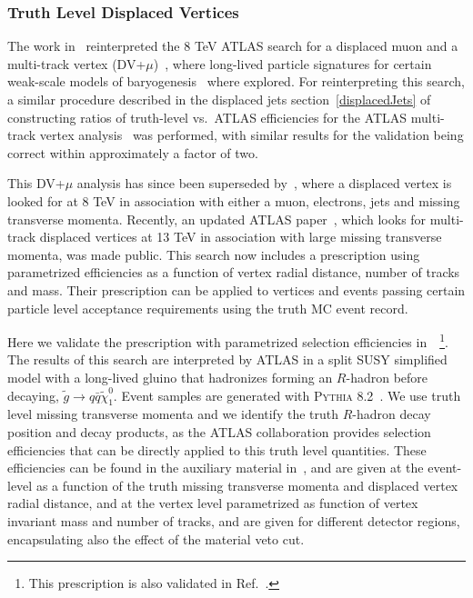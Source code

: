 \subsubsection{Truth Level Displaced Vertices}

The work in~\cite{Cui:2014twa} reinterpreted the 8 TeV ATLAS search for a displaced muon and a multi-track vertex (DV+$\mu$)~\cite{ATLAS-CONF-2013-092}, where long-lived particle signatures for certain weak-scale models of baryogenesis~\cite{Cui:2012jh,Cui:2013bta,Cui:2014twa} where explored. For reinterpreting this search, a similar procedure described in the displaced jets 
section~\ref{displacedJets} of constructing ratios of truth-level vs.~ATLAS efficiencies for the ATLAS multi-track vertex analysis~\cite{ATLAS-CONF-2013-092} was performed, with similar results for the validation being correct within approximately a factor of two. 

This DV+$\mu$ analysis has since been superseded by~\cite{Aad:2015rba}, where a displaced vertex is looked for at 8 TeV in association with either a muon, electrons, jets and missing transverse momenta. Recently, an updated ATLAS paper~\cite{Aaboud:2017iio}, which looks for multi-track displaced vertices at 13 TeV in association with large missing transverse momenta, was made public. This search now includes a prescription using parametrized efficiencies as a function of vertex radial distance, number of tracks and mass. Their prescription can be applied to vertices and events passing certain particle level acceptance requirements using the truth MC event record. 

Here we validate the prescription with parametrized selection efficiencies
in~\cite{Aaboud:2017iio}~\footnote{This prescription is also validated in
Ref.~\cite{LesHouches2017}.}. The results of this search are interpreted by ATLAS in a split SUSY simplified model with a long-lived gluino that hadronizes forming an $R$-hadron before decaying, $\tilde{g}\rightarrow q\bar{q}\tilde{\chi}^{0}_{1}$. Event samples are generated with \textsc{Pythia 8.2}~\cite{Sjostrand:2014zea}. We use truth level missing transverse momenta and we identify the truth $R$-hadron decay position and decay products, as the ATLAS collaboration provides selection efficiencies that can be directly applied to this truth level quantities. These efficiencies can be found in the auxiliary material in~\cite{SUSY-2016-08}, and are given at the event-level as a function of the truth missing transverse momenta and displaced vertex radial distance, and at the vertex level parametrized as function of vertex invariant mass and number of tracks, and are given for different detector regions, encapsulating also the effect of the material veto cut.


